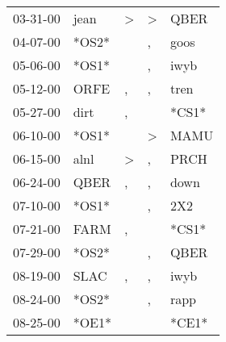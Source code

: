 \begin{supertabular}{p{0.07\textwidth}p{0.06\textwidth}p{0.02\textwidth}p{0.02\textwidth}p{0.06\textwidth}}
          03-31-00\textsuperscript{} &           jean\textsuperscript{} &     \textgreater &     \textgreater &           QBER\textsuperscript{} \\
          04-07-00\textsuperscript{} &                            *OS2* &                  &                , &           goos\textsuperscript{} \\
          05-06-00\textsuperscript{} &                            *OS1* &                  &                , &           iwyb\textsuperscript{} \\
          05-12-00\textsuperscript{} &           ORFE\textsuperscript{} &                , &                , &           tren\textsuperscript{} \\
          05-27-00\textsuperscript{} &           dirt\textsuperscript{} &                , &                  &                            *CS1* \\
          06-10-00\textsuperscript{} &                            *OS1* &                  &     \textgreater &           MAMU\textsuperscript{} \\
          06-15-00\textsuperscript{} &           alnl\textsuperscript{} &     \textgreater &                , &           PRCH\textsuperscript{} \\
          06-24-00\textsuperscript{} &           QBER\textsuperscript{} &                , &                , &           down\textsuperscript{} \\
          07-10-00\textsuperscript{} &                            *OS1* &                  &                , &            2X2\textsuperscript{} \\
          07-21-00\textsuperscript{} &           FARM\textsuperscript{} &                , &                  &                            *CS1* \\
          07-29-00\textsuperscript{} &                            *OS2* &                  &                , &           QBER\textsuperscript{} \\
          08-19-00\textsuperscript{} &           SLAC\textsuperscript{} &                , &                , &           iwyb\textsuperscript{} \\
          08-24-00\textsuperscript{} &                            *OS2* &                  &                , &           rapp\textsuperscript{} \\
          08-25-00\textsuperscript{} &                            *OE1* &                  &                  &                            *CE1* \\

\end{supertabular}
